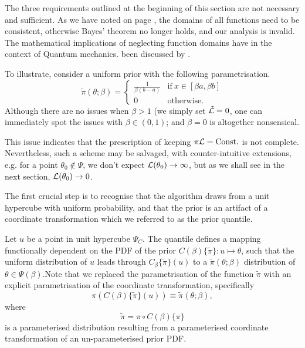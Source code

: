 \documentclass[usenatbib]{mnras}
\begin{document}
The three requirements outlined at the beginning of this section
are not necessary and sufficient. As we have noted on page
\pageref{domain-discussion}, the domains of all functions need to be
consistent, otherwise Bayes' theorem no longer holds, and our
analysis is invalid. The mathematical implications of neglecting
function domains have in the context of Quantum mechanics. been
discussed by \cite{Gieres_2000}.

To illustrate, consider a uniform prior with the following
parametrisation.
\begin{equation}
  \tilde{\pi}(\theta; \beta) =
  \begin{cases}
	\frac{1}{\beta(b-a)} & \text{if}\ x \in [\beta a, \beta b] \\
	0 & \text{otherwise}.
  \end{cases}
\end{equation}
Although there are no issues when \(\beta>1\) (we simply set \({\cal
	\tilde{L}}=0\), one can immediately spot the issues with \(\beta \in (0,1)\);
and \(\beta=0\) is altogether nonsensical.

This issue indicates that the prescription of keeping \(\pi {\cal
	L} = \text{Const.}\) is not complete. Nevertheless, such a scheme
may be salvaged, with counter-intuitive extensions, e.g. for a
point \(\theta_{0} \notin \Psi\), we don't expect \({\cal
	L}(\theta_{0}) \rightarrow \infty\), but as we shall see in the
next section, \({\cal L}(\theta_{0}) \rightarrow 0\).

The first crucial step is to recognise that the algorithm draws
from a unit hypercube with uniform probability, and that the prior
is an artifact of a coordinate transformation which we referred to
as the prior quantile.

Let \(u\) be a point in unit hypercube \(\Psi_{C}\). The quantile
defines a mapping functionally dependent on the PDF of the prior
\(C(\beta)\lbrace \tilde{\pi}\rbrace:u \mapsto \theta\), such that
the uniform distribution of \(u\) leads through
\(C_{\beta}\{\tilde{\pi}\}(u)\) to a \(\tilde{\pi}(\theta;\beta)\)
distribution of \(\theta \in\Psi(\beta)\).Note that we replaced the
parametrisation of the function \(\tilde{\pi}\) with an explicit
parametrisation of the coordinate transformation, specifically
\begin{equation}
  \pi(C(\beta)\{\tilde{\pi}\}(u)) \equiv \tilde{\pi}(\theta; \beta),
\end{equation}
where 
\begin{equation}
  \tilde{\pi} =  \pi \circ C(\beta) \{ \pi \} 
\end{equation}
is a parameterised distribution resulting from a parameterised
coordinate transformation of an un-parameterised prior PDF.
\end{document}
